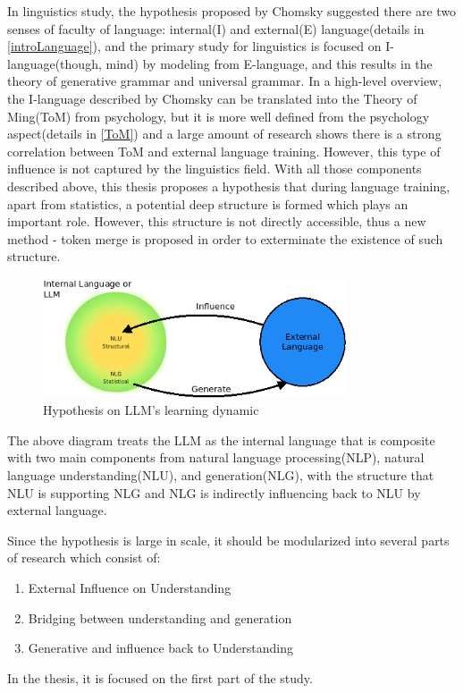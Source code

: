 \documentclass[12pt]{article}
\begin{document}
In linguistics study, the hypothesis proposed by Chomsky\cite{Hauser_2002} suggested there are two senses of faculty of language: internal(I) and external(E) language(details in \ref{introLanguage}), and the primary study for linguistics is focused on I-language(though, mind) by modeling from E-language, and this results in the theory of generative grammar and universal grammar. In a high-level overview, the I-language described by Chomsky can be translated into the Theory of Ming(ToM) from psychology, but it is more well defined from the psychology aspect(details in \ref{ToM}) and a large amount of research shows there is a strong correlation between ToM and external language training. However, this type of influence is not captured by the linguistics field. With all those components described above, this thesis proposes a hypothesis that during language training, apart from statistics, a potential deep structure is formed which plays an important role. However, this structure is not directly accessible, thus a new method - token merge is proposed in order to exterminate the existence of such structure. 
\begin{figure} [!h]
\begin{center}
\includegraphics[width=0.8\textwidth]{figures/Ilang_Elang_NLU_NLG.png}
\caption{Hypothesis on LLM's learning dynamic} 
\label{fig:LLMhypothesis}
\end{center}
\end{figure}

The above diagram treats the LLM as the internal language that is composite with two main components from natural language processing(NLP), natural language understanding(NLU), and generation(NLG), with the structure that NLU is supporting NLG and NLG is indirectly influencing back to NLU by external language. 

Since the hypothesis is large in scale, it should be modularized into several parts of research which consist of:
\begin{enumerate}
    \item External Influence on Understanding
    \item Bridging between understanding and generation
    \item Generative and influence back to Understanding
\end{enumerate}
In the thesis, it is focused on the first part of the study.
\end{document}
